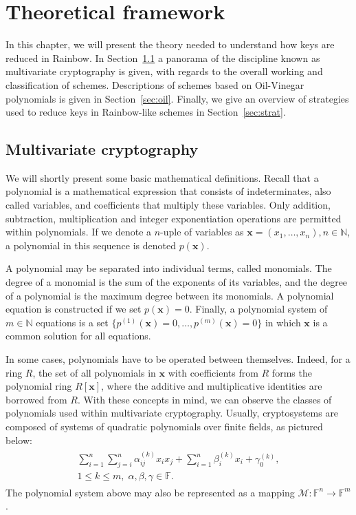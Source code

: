 \documentclass[openright]{report}
\begin{document}
\chapter{Theoretical framework}

In this chapter, we will present the theory needed to understand how keys are reduced in Rainbow. In Section~\ref{sec:mult} a panorama of the discipline known as multivariate cryptography is given, with regards to the overall working and classification of schemes. Descriptions of schemes based on Oil-Vinegar polynomials is given in Section~\ref{sec:oil}. Finally, we give an overview of strategies used to reduce keys in Rainbow-like schemes in Section~\ref{sec:strat}.

\section{Multivariate cryptography}\label{sec:mult}

We will shortly present some basic mathematical definitions. Recall that a polynomial is a mathematical expression that consists of indeterminates, also called variables, and coefficients that multiply these variables. Only addition, subtraction, multiplication and integer exponentiation operations are permitted within polynomials. If we denote a $n$-uple of variables as $\mathbf{x} = (x_{1}, \dots, x_{n}), n \in \mathbb{N}$, a polynomial in this sequence is denoted $p(\mathbf{x})$. 

A polynomial may be separated into individual terms, called monomials. The degree of a monomial is the sum of the exponents of its variables, and the degree of a polynomial is the maximum degree between its monomials. A polynomial equation is constructed if we set $p(\mathbf{x}) = 0$. Finally, a polynomial system of $m \in \mathbb{N}$ equations is a set $\{p^{(1)}(\mathbf{x}) = 0, \dots, p^{(m)}(\mathbf{x}) = 0\}$ in which $\mathbf{x}$ is a common solution for all equations.

In some cases, polynomials have to be operated between themselves. Indeed, for a ring $R$, the set of all polynomials in $\mathbf{x}$ with coefficients from $R$ forms the polynomial ring $R[\mathbf{x}]$, where the additive and multiplicative identities are borrowed from $R$. With these concepts in mind, we can observe the classes of polynomials used within multivariate cryptography. Usually, cryptosystems are composed of systems of quadratic polynomials over finite fields, as pictured below:
\begin{align}
    \begin{split}
        \sum_{i = 1}^{n} \sum_{j = i}^{n} \alpha_{ij}^{(k)} x_{i} x_{j} + \sum_{i = 1}^{n} \beta_{i}^{(k)} x_{i} + \gamma_{0}^{(k)}, \\
        1 \leq k \leq m, \; \alpha, \beta, \gamma \in \mathbb{F}.
    \end{split}
\end{align}
The polynomial system above may also be represented as a mapping $\mathcal{M}: \mathbb{F}^{n} \to \mathbb{F}^{m}$.
\end{document}

